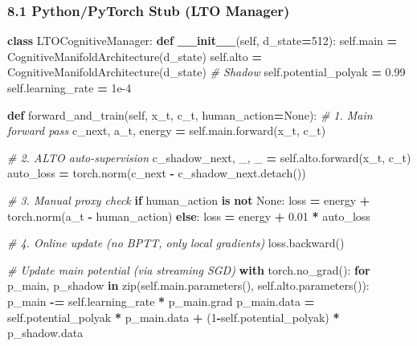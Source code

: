 \documentclass[
  11pt,
  a4paper,
]{article}
\newenvironment{Shaded}{\begin{snugshade}}{\end{snugshade}}
\newcommand{\BuiltInTok}[1]{#1}
\newcommand{\CommentTok}[1]{\textcolor[rgb]{0.56,0.35,0.01}{\textit{#1}}}
\newcommand{\ControlFlowTok}[1]{\textcolor[rgb]{0.13,0.29,0.53}{\textbf{#1}}}
\newcommand{\DecValTok}[1]{\textcolor[rgb]{0.00,0.00,0.81}{#1}}
\newcommand{\FloatTok}[1]{\textcolor[rgb]{0.00,0.00,0.81}{#1}}
\newcommand{\FunctionTok}[1]{\textcolor[rgb]{0.13,0.29,0.53}{\textbf{#1}}}
\newcommand{\KeywordTok}[1]{\textcolor[rgb]{0.13,0.29,0.53}{\textbf{#1}}}
\newcommand{\NormalTok}[1]{#1}
\newcommand{\OperatorTok}[1]{\textcolor[rgb]{0.81,0.36,0.00}{\textbf{#1}}}
\newcommand{\VariableTok}[1]{\textcolor[rgb]{0.00,0.00,0.00}{#1}}
\begin{document}
\subsubsection{8.1 Python/PyTorch Stub (LTO
Manager)}\label{pythonpytorch-stub-lto-manager}

\begin{Shaded}
\begin{Highlighting}[]
\KeywordTok{class}\NormalTok{ LTOCognitiveManager:}
    \KeywordTok{def} \FunctionTok{\_\_init\_\_}\NormalTok{(}\VariableTok{self}\NormalTok{, d\_state}\OperatorTok{=}\DecValTok{512}\NormalTok{):}
        \VariableTok{self}\NormalTok{.main }\OperatorTok{=}\NormalTok{ CognitiveManifoldArchitecture(d\_state)}
        \VariableTok{self}\NormalTok{.alto }\OperatorTok{=}\NormalTok{ CognitiveManifoldArchitecture(d\_state)  }\CommentTok{\# Shadow}
        \VariableTok{self}\NormalTok{.potential\_polyak }\OperatorTok{=} \FloatTok{0.99}
        \VariableTok{self}\NormalTok{.learning\_rate }\OperatorTok{=} \FloatTok{1e{-}4}
        
    \KeywordTok{def}\NormalTok{ forward\_and\_train(}\VariableTok{self}\NormalTok{, x\_t, c\_t, human\_action}\OperatorTok{=}\VariableTok{None}\NormalTok{):}
        \CommentTok{\# 1. Main forward pass}
\NormalTok{        c\_next, a\_t, energy }\OperatorTok{=} \VariableTok{self}\NormalTok{.main.forward(x\_t, c\_t)}
        
        \CommentTok{\# 2. ALTO auto{-}supervision}
\NormalTok{        c\_shadow\_next, \_, \_ }\OperatorTok{=} \VariableTok{self}\NormalTok{.alto.forward(x\_t, c\_t)}
\NormalTok{        auto\_loss }\OperatorTok{=}\NormalTok{ torch.norm(c\_next }\OperatorTok{{-}}\NormalTok{ c\_shadow\_next.detach())}
        
        \CommentTok{\# 3. Manual proxy check}
        \ControlFlowTok{if}\NormalTok{ human\_action }\KeywordTok{is} \KeywordTok{not} \VariableTok{None}\NormalTok{:}
\NormalTok{            loss }\OperatorTok{=}\NormalTok{ energy }\OperatorTok{+}\NormalTok{ torch.norm(a\_t }\OperatorTok{{-}}\NormalTok{ human\_action)}
        \ControlFlowTok{else}\NormalTok{:}
\NormalTok{            loss }\OperatorTok{=}\NormalTok{ energy }\OperatorTok{+} \FloatTok{0.01} \OperatorTok{*}\NormalTok{ auto\_loss}
        
        \CommentTok{\# 4. Online update (no BPTT, only local gradients)}
\NormalTok{        loss.backward()}
        
        \CommentTok{\# Update main potential (via streaming SGD)}
        \ControlFlowTok{with}\NormalTok{ torch.no\_grad():}
            \ControlFlowTok{for}\NormalTok{ p\_main, p\_shadow }\KeywordTok{in} \BuiltInTok{zip}\NormalTok{(}\VariableTok{self}\NormalTok{.main.parameters(), }\VariableTok{self}\NormalTok{.alto.parameters()):}
\NormalTok{                p\_main }\OperatorTok{{-}=} \VariableTok{self}\NormalTok{.learning\_rate }\OperatorTok{*}\NormalTok{ p\_main.grad}
\NormalTok{                p\_main.data }\OperatorTok{=} \VariableTok{self}\NormalTok{.potential\_polyak }\OperatorTok{*}\NormalTok{ p\_main.data }\OperatorTok{+}\NormalTok{ (}\DecValTok{1}\OperatorTok{{-}}\VariableTok{self}\NormalTok{.potential\_polyak) }\OperatorTok{*}\NormalTok{ p\_shadow.data}
        

\end{Highlighting}
\end{Shaded}
\end{document}
